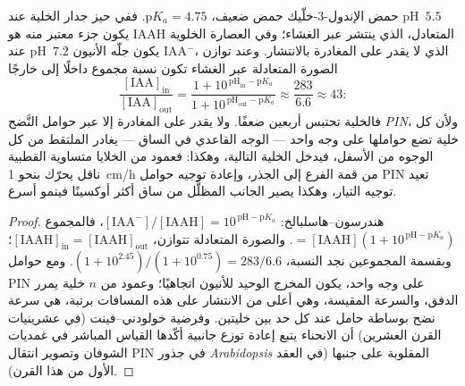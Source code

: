 \begin{theorem}\label{thm:b3:plant-molecular-physiology:auxin}
حمض الإندول-3-خلّيك حمض ضعيف، $\mathrm{p}K_{a} = 4.75$. ففي
حيز جدار الخلية عند pH~$5.5$ يكون جزء معتبر منه هو IAAH
المتعادل، الذي ينتشر عبر الغشاء؛ وفي العصارة الخلوية عند pH~$7.2$
يكون جلّه الأنيون IAA$^{-}$، الذي لا يقدر على المغادرة
بالانتشار. وعند توازن الصورة المتعادلة عبر الغشاء تكون نسبة
مجموع  داخلًا إلى خارجًا
\[
\frac{[\text{IAA}]_{\text{in}}}{[\text{IAA}]_{\text{out}}}
= \frac{1 + 10^{\,\mathrm{pH}_{\text{in}} - \mathrm{p}K_{a}}}{1 + 10^{\,\mathrm{pH}_{\text{out}} - \mathrm{p}K_{a}}}
\approx \frac{283}{6.6} \approx 43 :
\]
فالخلية تحتبس  أربعين ضعفًا. ولا يقدر على المغادرة
إلا عبر حوامل النَّضح \emph{PIN}، ولأن كل خلية تضع حواملها
على وجه واحد --- الوجه القاعدي في الساق --- يغادر 
الملتقط من كل الوجوه من الأسفل، فيدخل الخلية التالية، وهكذا:
فعمود من الخلايا متساوية القطبية ناقل يحرّك  بنحو
\qty{1}{cm/h} من قمة الفرع إلى الجذر، وإعادة توجيه حوامل PIN
تعيد توجيه التيار، وهكذا يصير الجانب المظلَّل من ساق أكثر
أوكسينًا فينمو أسرع.
\end{theorem}
\begin{proof}
هندرسون--هاسلبالخ: $[\text{IAA}^{-}]/[\text{IAAH}] = 10^{\,\mathrm{pH}
- \mathrm{p}K_{a}}$، فالمجموع $= [\text{IAAH}](1 + 10^{\,\mathrm{pH} -
\mathrm{p}K_{a}})$. والصورة المتعادلة تتوازن، $[\text{IAAH}]_{\text{in}}
= [\text{IAAH}]_{\text{out}}$؛ وبقسمة المجموعين نجد النسبة،
$(1 + 10^{2.45})/(1 + 10^{0.75}) = 283/6.6$. ومع حوامل PIN على وجه
واحد، يكون المخرج الوحيد للأنيون اتجاهيًا؛ وعمود من $n$ خلية
يمرر الدفق، والسرعة المقيسة، وهي أعلى من الانتشار على هذه
المسافات برتبة، هي سرعة نضح بوساطة حامل عند كل حد بين
خليتين. وفرضية خولودني--فينت (في عشرينيات القرن العشرين) أن
الانحناء يتبع إعادة توزع جانبية  أكّدها القياس
المباشر في غمديات الشوفان وتصوير انتقال PIN في جذور
\emph{Arabidopsis} المقلوبة على جنبها (في العقد الأول من هذا
القرن).
\end{proof}

